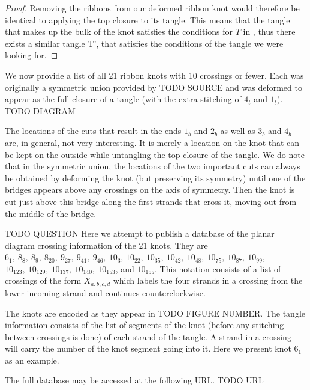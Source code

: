 \begin{paper}
\begin{proof}

Removing the ribbons from our deformed ribbon knot would therefore be identical
to applying the top closure to its tangle.
This means that the tangle that makes up the bulk of the knot satisfies the
conditions for $T$ in \lemtangles, thus there exists a similar tangle T', that
satisfies the conditions of the tangle we were looking for.
\end{proof}
We now provide a list of all 21 ribbon knots with 10 crossings or fewer.
Each was originally a symmetric union provided by TODO SOURCE and was deformed
to appear as the full closure of a tangle (with the extra stitching of $4_t$ and
$1_t$).
TODO DIAGRAM

The locations of the cuts that result in the ends $1_b$ and $2_b$ as well as
$3_b$ and $4_b$ are, in general, not very interesting.
It is merely a location on the knot that can be kept on the outside while
untangling the top closure of the tangle.
We do note that in the symmetric union, the locations of the two important cuts
can always be obtained by deforming the knot (but preserving its symmetry) until
one of the bridges appears above any crossings on the axis of symmetry.
Then the knot is cut just above this bridge along the first strands that cross
it, moving out from the middle of the bridge.


TODO QUESTION
Here we attempt to publish a database of the planar diagram crossing information
of the 21 knots.
They are $6_1,~8_8,~8_9,~8_{20},~9_{27},~9_{41},~9_{46},~10_3$,
$10_{22},~10_{35},~10_{42},~10_{48},~10_{75},~10_{87},~10_{99}$,
$10_{123},~10_{129},~10_{137},~10_{140},~10_{153}$, and $10_{155}$.
This notation consists of a list of crossings of the form $X_{a,b,c,d}$ which
labels the four strands in a crossing from the lower incoming strand and
continues counterclockwise.


The knots are encoded as they appear in TODO FIGURE NUMBER.
The tangle information consists of the list of segments of the knot (before any
stitching between crossings is done) of each strand of the tangle.
A strand in a crossing will carry the number of the knot segment going into it.
Here we present knot $6_1$ as an example.


The full database may be accessed at the following URL.
TODO URL
\end{paper}

